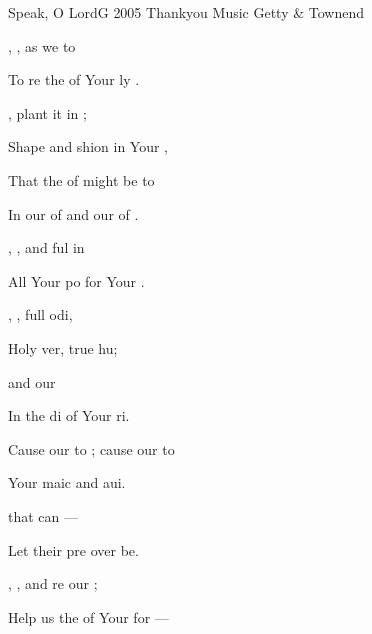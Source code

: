 \begin{song}{Speak, O Lord}{G}
    {2005 Thankyou Music}
    {Getty \& Townend}
    {}
    {\CCLIed}

\begin{SBVerse}
,  , 
    as we  to 

To re the  
    of Your ly .

  , 
    plant it  in ;

Shape and shion  
    in Your ,

That the  of  
    might be  to

In our  of  
    and our  of .

,  , 
    and ful in  

All Your po for Your .
\end{SBVerse}

\begin{SBVerse}
 , , 
    full odi,

Holy ver, 
    true hu;
    
   
    and our 

In the di 
    of Your ri.

Cause our  to ; 
    cause our  to 

Your maic  
    and aui.

   
    that can  —

Let their  pre 
    over be.
\end{SBVerse}

\begin{SBVerse}
,  , 
    and re our ;

Help us  the  
    of Your  for —


\end{SBVerse}
\end{song}
